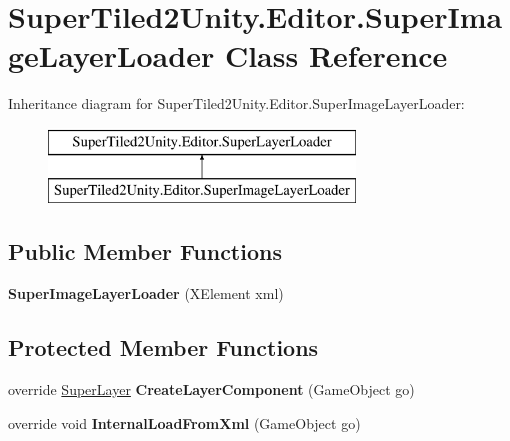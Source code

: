 \hypertarget{class_super_tiled2_unity_1_1_editor_1_1_super_image_layer_loader}{}\section{Super\+Tiled2\+Unity.\+Editor.\+Super\+Image\+Layer\+Loader Class Reference}
\label{class_super_tiled2_unity_1_1_editor_1_1_super_image_layer_loader}
Inheritance diagram for Super\+Tiled2\+Unity.\+Editor.\+Super\+Image\+Layer\+Loader\+:\begin{figure}[H]
\begin{center}
\leavevmode
\includegraphics[height=2.000000cm]{class_super_tiled2_unity_1_1_editor_1_1_super_image_layer_loader}
\end{center}
\end{figure}
\subsection*{Public Member Functions}
\begin{DoxyCompactItemize}
\item 
\mbox{\label{class_super_tiled2_unity_1_1_editor_1_1_super_image_layer_loader_aed4b0be80c3fdbffdf73ab65d874613a}} 
{\bfseries Super\+Image\+Layer\+Loader} (X\+Element xml)
\end{DoxyCompactItemize}
\subsection*{Protected Member Functions}
\begin{DoxyCompactItemize}
\item 
\mbox{\label{class_super_tiled2_unity_1_1_editor_1_1_super_image_layer_loader_a90547ff6e597ebf561d95c1332ae878c}} 
override \mbox{\hyperlink{class_super_tiled2_unity_1_1_super_layer}{Super\+Layer}} {\bfseries Create\+Layer\+Component} (Game\+Object go)
\item 
\mbox{\label{class_super_tiled2_unity_1_1_editor_1_1_super_image_layer_loader_a744174674627fe83bcd9cf62b6f70764}} 
override void {\bfseries Internal\+Load\+From\+Xml} (Game\+Object go)
\end{DoxyCompactItemize}
